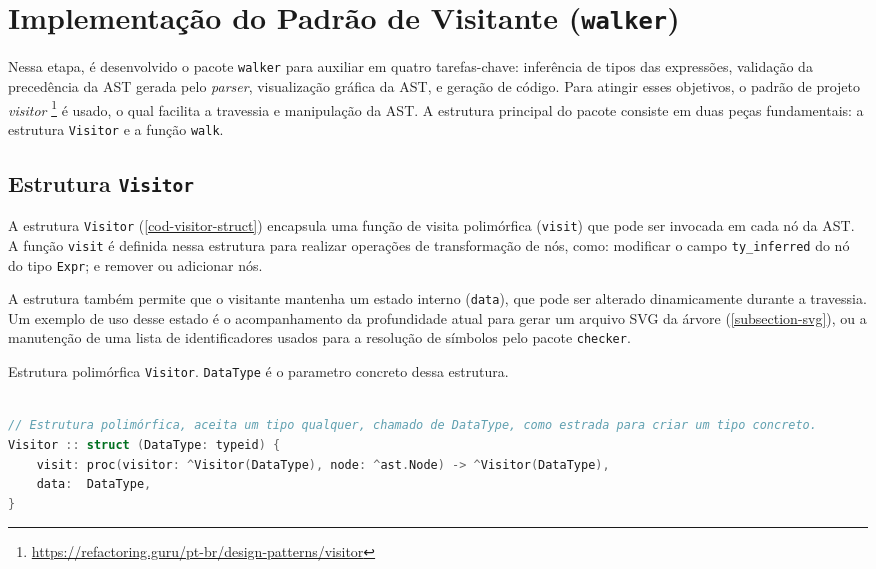 
\section{Implementação do Padrão de Visitante (\texttt{walker})} \label{section-walker}


Nessa etapa, é desenvolvido o pacote \texttt{walker} para auxiliar em quatro tarefas-chave: inferência de tipos das expressões, validação da precedência da AST gerada pelo \textit{parser}, visualização gráfica da AST, e geração de código. Para atingir esses objetivos, o padrão de projeto \textit{visitor} \footnote{\url{https://refactoring.guru/pt-br/design-patterns/visitor}} é usado, o qual facilita a travessia e manipulação da AST. A estrutura principal do pacote consiste em duas peças fundamentais: a estrutura \texttt{Visitor} e a função \texttt{walk}.

\subsection{Estrutura \texttt{Visitor}}

A estrutura \texttt{Visitor} (\autoref{cod-visitor-struct}) encapsula uma função de visita polimórfica (\texttt{visit}) que pode ser invocada em cada nó da AST. A função \texttt{visit} é definida nessa estrutura para realizar operações de transformação de nós, como: modificar o campo \texttt{ty\_inferred} do nó do tipo \texttt{Expr}; e remover ou adicionar nós.

A estrutura também permite que o visitante mantenha um estado interno (\texttt{data}), que pode ser alterado dinamicamente durante a travessia. Um exemplo de uso desse estado é o acompanhamento da profundidade atual para gerar um arquivo SVG da árvore (\autoref{subsection-svg}), ou a manutenção de uma lista de identificadores usados para a resolução de símbolos pelo pacote \texttt{checker}.



\begin{codigo}[!ht]
    \caption{\small Estrutura polimórfica \texttt{Visitor}. \texttt{DataType} é o parametro concreto dessa estrutura. }
        \label{cod-visitor-struct}
\begin{lstlisting}[language = C]

// Estrutura polimórfica, aceita um tipo qualquer, chamado de DataType, como estrada para criar um tipo concreto.
Visitor :: struct (DataType: typeid) {
    visit: proc(visitor: ^Visitor(DataType), node: ^ast.Node) -> ^Visitor(DataType),
    data:  DataType,
}
\end{lstlisting}
\end{codigo}

